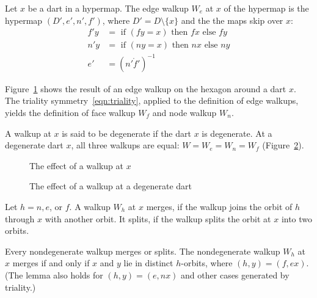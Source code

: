 \begin{definition}[walkup]
Let $x$ be a dart in a hypermap.  The edge walkup 
$W_e$ at $x$ of the hypermap is the hypermap
$(D',e',n',f')$, where $D' = D\setminus\{x\}$ and the
the maps skip over $x$:
    $$
    \begin{array}{lll}
    f' y &= \text{ if } (f y =  x) \text{ then } f x \text{ else
    } f y\\
    n' y &= \text{ if } (n y = x) \text{ then } n x \text{ else
    } n y\\
    e' &= (n'\ocirc f')^{-1}
    \end{array}
    $$
\end{definition}

Figure~\ref{fig:walk} shows
the result of an edge walkup on the hexagon around a dart $x$.
The triality symmetry~\ref{eqn:triality}, applied to the definition
of edge walkups, yields the definition of
face walkup $W_f$ and node walkup $W_n$.  

A walkup at $x$ is said to be degenerate if the dart $x$ is degenerate.   At a degenerate dart $x$, all three walkups are equal: $W=W_e=W_n=W_f$ (Figure~\ref{fig:walkdegen}).

\begin{figure}[htb]
  \centering
  \caption{The effect of a walkup at $x$}
  \label{fig:walk}
\end{figure}


\begin{figure}[htb]
  \centering
  \caption{The effect of a walkup at a degenerate dart}
  \label{fig:walkdegen}
\end{figure}


\begin{definition} Let $h=n,e$, or $f$.
A walkup $W_h$ at $x$ merges,
if the walkup joins the orbit of $h$ through $x$ with another orbit.  
It splits, if the walkup splits the orbit at $x$ into two orbits.
\end{definition}

\begin{lemma} 
Every nondegenerate walkup merges or splits. The nondegenerate walkup $W_h$ at $x$ merges if and only if $x$ and $y$  lie in distinct $h$-orbits, where $(h,y)=(f,e x)$.   (The lemma also holds for $(h,y)=(e,n x)$ and other cases generated
by triality.)
\end{lemma}

